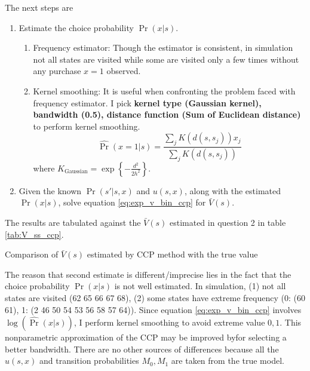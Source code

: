 \documentclass[12pt]{article}[margin=1in]
\begin{document}
The next steps are
\begin{enumerate}
    \item Estimate the choice probability ${\Pr}(x|s)$.
          \begin{enumerate}
              \item Frequency estimator: Though the estimator is consistent, in simulation not all
                    states are visited while some are visited only a few times without any purchase
                    $x=1$ observed.
              \item Kernel smoothing: It is useful when confronting the problem faced with
                    frequency estimator. I pick \textbf{kernel type (Gaussian kernel), bandwidth
                        (0.5), distance function (Sum of Euclidean distance)} to perform kernel
                    smoothing.
                    \begin{equation*}
                        \hat{\Pr}(x=1|s)=\frac{\sum_j K(d(s,s_j))x_j}{\sum_j K(d(s,s_j))}
                    \end{equation*}
                    where $K_{\text{Gaussian}}=\exp\left\{-\frac{d^2}{2h^2}\right\}$.
          \end{enumerate}
    \item Given the known $\Pr(s'|s,x)$ and $u(s,x)$, along with the estimated
          $\Pr(x|s)$, solve equation \ref{eq:exp_v_bin_ccp} for $\bar{V}(s)$.
\end{enumerate}
The results are tabulated against the $\bar{V}(s)$ estimated in question 2 in table \ref{tab:V_ss_ccp}.
\begin{table}\fontsize{6pt}{8pt}\selectfont
    \centering
    
    \caption{Comparison of $\bar{V}(s)$ estimated by CCP method with the true value}
    \label{tab:V_ss_ccp}
\end{table}
The reason that second estimate is different/imprecise lies in the fact that the choice probability $\Pr(x|s)$ is not well estimated. In simulation, (1) not all states are visited (62 65 66 67 68), (2) some states have extreme frequency (0: (60 61), 1: (2 46 50 54 53 56 58 57 64)). Since equation \ref{eq:exp_v_bin_ccp} involves $\log(\hat{\Pr}(x|s))$, I perform kernel smoothing to avoid extreme value $0,1$. This nonparametric approximation of the CCP may be improved byfor selecting a better bandwidth. There are no other sources of differences because all the $u(s,x)$ and transition probabilities $M_0,M_1$ are taken from the true model.
\end{document}
